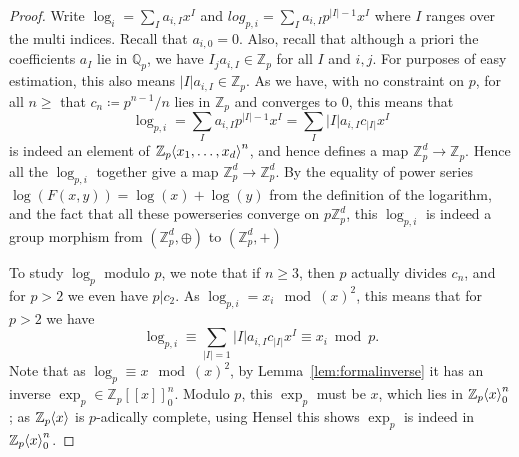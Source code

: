 \documentclass[12pt]{article}
\newcommand{\Z}{\mathbb{Z}}
\newcommand{\Q}{\mathbb{Q}}
\renewcommand{\angle}[1]{\hspace{-2pt}\left\langle #1 \right\rangle}
\theoremstyle{plain}
\theoremstyle{definition}
\theoremstyle{remark}
\begin{document}
\begin{proof}
Write $\log_{i} = \sum_{I} a_{i,I} x^I$ and $log_{p,i} = \sum_I a_{i,I} p^{|I|-1} x^I$ where $I$ ranges over the multi indices. Recall that $a_{i,0} = 0$. Also, recall that although a priori the coefficients $a_I$ lie in $\Q_p$, we have $I_j a_{i,I} \in \Z_p$ for all $I$ and $i,j$. For purposes of easy estimation, this also means $|I|a_{i,I} \in \Z_p$. As we have, with no constraint on $p$, for all $n\geq $ that $c_n\coloneqq p^{n-1}/n$ lies in $\Z_p$ and converges to $0$, this means that \[ \log_{p,i} = \sum_I a_{i,I} p^{|I|-1} x^I = \sum_I |I|a_{i,I} c_{|I|} x^I\] is indeed an element of $\Z_p\angle{x_1,\dots,x_d}^n$, and hence defines a map $\Z_p^d \to \Z_p$. Hence all the $\log_{p,i}$ together give a map $\Z_p^d \to \Z_p^d$. By the equality of power series $\log(F(x,y)) = \log(x)+\log(y)$ from the definition of the logarithm, and the fact that all these powerseries converge on $p\Z_p^d$, this $\log_{p,i}$ is indeed a group morphism from $(\Z_p^d,\oplus)$ to $(\Z_p^d,+)$

To study $\log_p$ modulo $p$, we note that if $n\geq 3$, then $p$ actually divides $c_n$, and for $p > 2$ we even have $p|c_2$. As $\log_{p,i} = x_i \mod (x)^2$, this means that for $p > 2$ we have \[\log_{p,i} \equiv \sum_{|I| = 1} |I|a_{i,I}c_{|I|} x^I \equiv x_i \bmod p.\]
Note that as $\log_p \equiv x \mod (x)^2$, by Lemma~\ref{lem:formalinverse} it has an inverse $\exp_p \in \Z_p[[x]]_0^n$. Modulo $p$, this $\exp_p$ must be $x$, which lies in $\Z_p\angle{x}_0^n$; as $\Z_p\angle{x}$ is $p$-adically complete, using Hensel this shows $\exp_p$ is indeed in $\Z_p\angle{x}_0^n$.


\end{proof}
\end{document}
